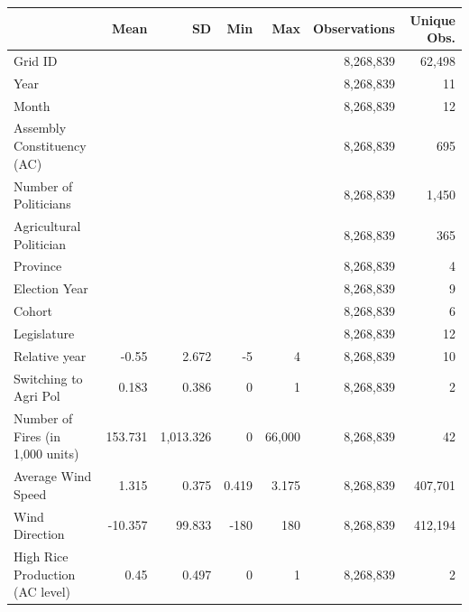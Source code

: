 \begin{tabular}{lrrrrrr}
\toprule
 & Mean & SD & Min & Max & Observations & Unique Obs.\\
\midrule
Grid ID &  &  &  &  & 8,268,839 & 62,498\\
Year &  &  &  &  & 8,268,839 & 11\\
Month &  &  &  &  & 8,268,839 & 12\\
Assembly Constituency (AC) &  &  &  &  & 8,268,839 & 695\\
Number of Politicians &  &  &  &  & 8,268,839 & 1,450\\
Agricultural Politician &  &  &  &  & 8,268,839 & 365\\
Province &  &  &  &  & 8,268,839 & 4\\
Election Year &  &  &  &  & 8,268,839 & 9\\
Cohort &  &  &  &  & 8,268,839 & 6\\
Legislature &  &  &  &  & 8,268,839 & 12\\
Relative year & -0.55 & 2.672 & -5 & 4 & 8,268,839 & 10\\
Switching to Agri Pol & 0.183 & 0.386 & 0 & 1 & 8,268,839 & 2\\
Number of Fires (in 1,000 units) & 153.731 & 1,013.326 & 0 & 66,000 & 8,268,839 & 42\\
Average Wind Speed & 1.315 & 0.375 & 0.419 & 3.175 & 8,268,839 & 407,701\\
Wind Direction & -10.357 & 99.833 & -180 & 180 & 8,268,839 & 412,194\\
High Rice Production (AC level) & 0.45 & 0.497 & 0 & 1 & 8,268,839 & 2\\
\bottomrule
\end{tabular}
